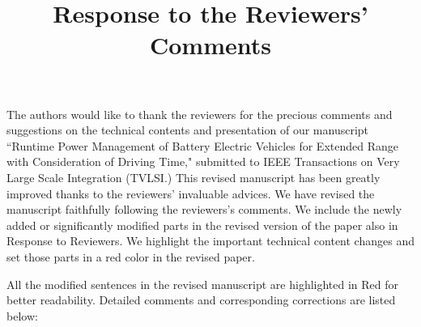 \documentclass[onecolumn]{IEEEconf}
\title{Response to the Reviewers' Comments}
\begin{document}
\maketitle


The authors would like to thank the reviewers for the precious comments and suggestions on the technical contents and presentation of our manuscript ``Runtime Power Management of Battery Electric Vehicles for Extended Range with Consideration of Driving Time," submitted to IEEE Transactions on Very Large Scale Integration (TVLSI.) This revised manuscript has been greatly improved thanks to the reviewers' invaluable advices. 
We have revised the manuscript faithfully following the reviewers's comments. We include the newly added or significantly modified parts in the revised version of the paper also in Response to Reviewers. We highlight the important technical content changes and set those parts in a red color in the revised paper. 

All the modified sentences in the revised manuscript are highlighted in Red for better readability. Detailed comments and corresponding corrections are listed below:\\
\end{document}
